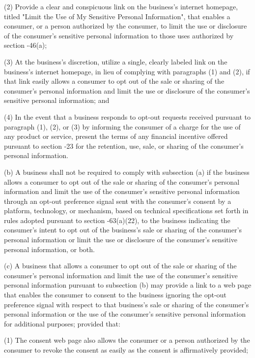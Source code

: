      (2)  Provide a clear and conspicuous link on the business's internet homepage, titled "Limit the Use of My Sensitive Personal Information", that enables a consumer, or a person authorized by the consumer, to limit the use or disclosure of the consumer's sensitive personal information to those uses authorized by section    -46(a);

     (3)  At the business's discretion, utilize a single, clearly labeled link on the business's internet homepage, in lieu of complying with paragraphs (1) and (2), if that link easily allows a consumer to opt out of the sale or sharing of the consumer's personal information and limit the use or disclosure of the consumer's sensitive personal information; and

     (4)  In the event that a business responds to opt-out requests received pursuant to paragraph (1), (2), or (3) by informing the consumer of a charge for the use of any product or service, present the terms of any financial incentive offered pursuant to section    -23 for the retention, use, sale, or sharing of the consumer's personal information.

     (b)  A business shall not be required to comply with subsection (a) if the business allows a consumer to opt out of the sale or sharing of the consumer's personal information and limit the use of the consumer's sensitive personal information through an opt-out preference signal sent with the consumer's consent by a platform, technology, or mechanism, based on technical specifications set forth in rules adopted pursuant to section    -63(a)(22), to the business indicating the consumer's intent to opt out of the business's sale or sharing of the consumer's personal information or limit the use or disclosure of the consumer's sensitive personal information, or both.

     (c)  A business that allows a consumer to opt out of the sale or sharing of the consumer's personal information and limit the use of the consumer's sensitive personal information pursuant to subsection (b) may provide a link to a web page that enables the consumer to consent to the business ignoring the opt-out preference signal with respect to that business's sale or sharing of the consumer's personal information or the use of the consumer's sensitive personal information for additional purposes; provided that:

     (1)  The consent web page also allows the consumer or a person authorized by the consumer to revoke the consent as easily as the consent is affirmatively provided;

